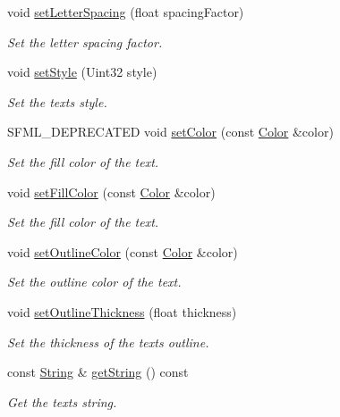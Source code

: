 \begin{DoxyCompactItemize}
void \mbox{\hyperlink{classsf_1_1_text_ab516110605edb0191a7873138ac42af2}{set\+Letter\+Spacing}} (float spacing\+Factor)
\begin{DoxyCompactList}\small\item\em Set the letter spacing factor. \end{DoxyCompactList}\item 
void \mbox{\hyperlink{classsf_1_1_text_ad791702bc2d1b6590a1719aa60635edf}{set\+Style}} (Uint32 style)
\begin{DoxyCompactList}\small\item\em Set the text\textquotesingle{}s style. \end{DoxyCompactList}\item 
S\+F\+M\+L\+\_\+\+D\+E\+P\+R\+E\+C\+A\+T\+ED void \mbox{\hyperlink{classsf_1_1_text_a6ce65272d6d63ed01118366e92c68132}{set\+Color}} (const \mbox{\hyperlink{classsf_1_1_color}{Color}} \&color)
\begin{DoxyCompactList}\small\item\em Set the fill color of the text. \end{DoxyCompactList}\item 
void \mbox{\hyperlink{classsf_1_1_text_ab7bb3babac5a6da1802b2c3e1a3e6dcc}{set\+Fill\+Color}} (const \mbox{\hyperlink{classsf_1_1_color}{Color}} \&color)
\begin{DoxyCompactList}\small\item\em Set the fill color of the text. \end{DoxyCompactList}\item 
void \mbox{\hyperlink{classsf_1_1_text_aa19ec69c3b894e963602a6804ca68fe4}{set\+Outline\+Color}} (const \mbox{\hyperlink{classsf_1_1_color}{Color}} \&color)
\begin{DoxyCompactList}\small\item\em Set the outline color of the text. \end{DoxyCompactList}\item 
void \mbox{\hyperlink{classsf_1_1_text_ab0e6be3b40124557bf53737fe6a6ce77}{set\+Outline\+Thickness}} (float thickness)
\begin{DoxyCompactList}\small\item\em Set the thickness of the text\textquotesingle{}s outline. \end{DoxyCompactList}\item 
const \mbox{\hyperlink{classsf_1_1_string}{String}} \& \mbox{\hyperlink{classsf_1_1_text_a084c275eb4bca835696af5f8f9c80ab3}{get\+String}} () const
\begin{DoxyCompactList}\small\item\em Get the text\textquotesingle{}s string. \end{DoxyCompactList}\item 

\end{DoxyCompactItemize}
